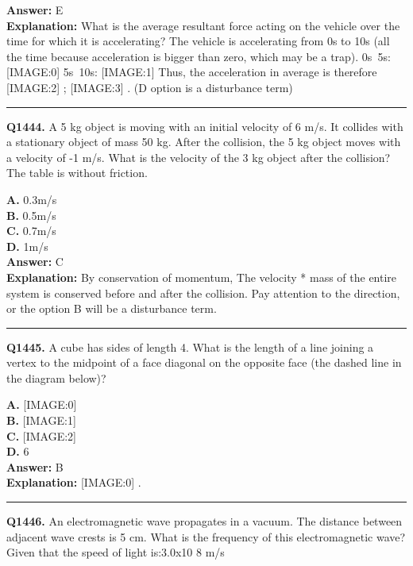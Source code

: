 \documentclass[12pt]{article}
\begin{document}
\textbf{Answer:} E \\
\textbf{Explanation:} What is the average resultant force acting on the vehicle over the time for which it is accelerating?
The vehicle is accelerating from 0s to 10s (all the time because acceleration is bigger than zero, which may be a trap).
0s~5s:
[IMAGE:0]
5s~10s:
[IMAGE:1]
Thus, the acceleration in average is therefore
[IMAGE:2]
;
[IMAGE:3]
. (D option is a disturbance term)

\hrule
\vspace{1em}


\noindent
\textbf{Q1444.} A 5 kg object is moving with an initial velocity of 6 m/s. It collides with a stationary object of mass 50 kg. After the collision, the 5 kg object moves with a velocity of -1 m/s. What is the velocity of the 3 kg object after the collision? The table is without friction.



\textbf{A.} 0.3m/s \\
\textbf{B.} 0.5m/s \\
\textbf{C.} 0.7m/s \\
\textbf{D.} 1m/s \\

\textbf{Answer:} C \\
\textbf{Explanation:} By conservation of momentum, The velocity * mass of the entire system is conserved before and after the collision.
Pay attention to the direction, or the option B will be a disturbance term.

\hrule
\vspace{1em}


\noindent
\textbf{Q1445.} A cube has sides of length 4. What is the length of a line joining a vertex to the midpoint of a face diagonal on the opposite face (the dashed line in the diagram below)?



\textbf{A.} [IMAGE:0] \\
\textbf{B.} [IMAGE:1] \\
\textbf{C.} [IMAGE:2] \\
\textbf{D.} 6 \\

\textbf{Answer:} B \\
\textbf{Explanation:} [IMAGE:0]
.

\hrule
\vspace{1em}


\noindent
\textbf{Q1446.} An electromagnetic wave propagates in a vacuum. The distance between adjacent wave crests is 5 cm. What is the frequency of this electromagnetic wave? Given that the speed of light is:3.0x10
8
m/s
\end{document}
